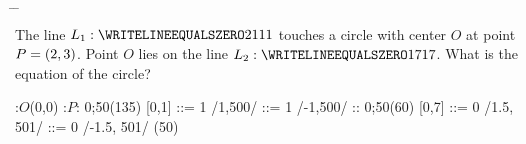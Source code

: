 

\ADD{}\a
\ADD{}\b
\SUBTRACT\vd\a\distx
\SUBTRACT\ve\b\disty
\gcalcexpr[0]\rsq{(\distx * \distx) + (\disty * \disty)}
\gcalcexpr[0]\tp{(\va * \ve) + (\vb * \vd)}

\question[4] The line $L_1: \WRITELINEEQUALSZERO\va\vb\vc\vb$ touches a circle 
with center $O$ at point $P = (2, 3)$. Point $O$ lies on the line
$L_2: \WRITELINEEQUALSZERO\vf\vg\vh\vg$. What is the equation of the circle?

\watchout

\ifprintanswers
    \def\rad{50}
    :$O$(0,0)
     :$P$: 0;\rad (135)
     [0,1]
     ::= 1 /1,500/
     ::= 1 /-1,500/
     :: 0;\rad (60)
     [0,7]
     ::= 0 /1.5, 501/
     ::= 0 /-1.5, 501/
  \figdrawbegin{}
     (\rad)
    \figdrawline [2,1,3]
    \figdrawline [0,1]
    \figdrawline [9,0,8]
  \figdrawend
  \vspace{0.7cm}
  \centerline{\box\figBoxA}
\fi 

